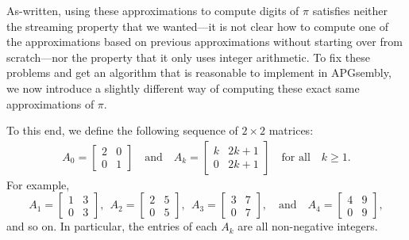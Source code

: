 As-written, using these approximations to compute digits of $\pi$ satisfies neither the streaming property that we wanted---it is not clear how to compute one of the approximations based on previous approximations without starting over from scratch---nor the property that it only uses integer arithmetic. To fix these problems and get an algorithm that is reasonable to implement in APGsembly, we now introduce a slightly different way of computing these exact same approximations of $\pi$.

To this end, we define the following sequence of $2 \times 2$ matrices:
\begin{align}\label{eq:Ak_matrices}
	A_0 = \begin{bmatrix}
		2 & 0 \\ 0 & 1
	\end{bmatrix} \quad \text{and} \quad A_k = \begin{bmatrix}
		k & 2k+1 \\ 0 & 2k+1
	\end{bmatrix} \quad \text{for all} \quad k \geq 1.
\end{align}
For example,
\[
A_1 = \begin{bmatrix}
1 & 3 \\ 0 & 3
\end{bmatrix}, \ \ A_2 = \begin{bmatrix}
2 & 5 \\ 0 & 5
\end{bmatrix}, \ \ A_3 = \begin{bmatrix}
3 & 7 \\ 0 & 7
\end{bmatrix}, \quad \text{and} \quad A_4 = \begin{bmatrix}
4 & 9 \\ 0 & 9
\end{bmatrix},
\]
and so on. In particular, the entries of each $A_k$ are all non-negative integers.

